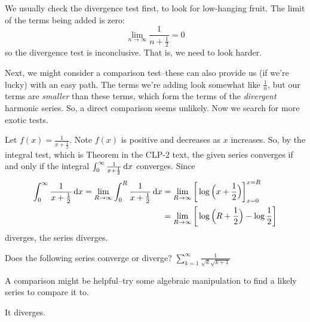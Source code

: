 \begin{solution}
We usually check the divergence test first, to look for low-hanging fruit. The limit of the terms being added is zero:
\[\lim_{n \to \infty}\frac{1}{n+\frac{1}{2}}=0\]
so the divergence test is inconclusive. That is, we need to look harder.

Next, we might consider a comparison test--these can also provide us (if we're lucky) with an easy path. The terms we're adding look somewhat like $\frac{1}{n}$, but our terms are \emph{smaller} than these terms, which form the terms of the \emph{divergent} harmonic series. So, a direct comparison seems unlikely. Now we search for more exotic tests.

Let $\displaystyle f(x) =\frac{1}{x+\frac{1}{2}}$.
Note $f(x)$ is positive and decreases as $x$ increases.
So, by the integral test, which is
Theorem  in the CLP-2 text,
the given series converges if and only if the
integral $\int_0^\infty\frac{1}{x+\frac{1}{2}} \,\mathrm{d}x$ converges.
Since
\begin{align*}
\int_0^\infty \frac{1}{x+\frac{1}{2}} \,\mathrm{d}x =
\lim_{R\rightarrow\infty} \int_0^R\frac{1}{x+\frac{1}{2}} \,\mathrm{d}x
&=\lim_{R\rightarrow\infty} \bigg[ \log\Big(x+\frac{1}{2}\Big)\bigg]^{x=R}_{x=0} \\
&=\lim_{R\to\infty} \bigg[ \log\Big(R+\frac{1}{2}\Big) - \log\frac12 \bigg]
\end{align*}
diverges, the series diverges.
\end{solution}






\begin{Mquestion}
Does the following series converge or diverge?
$\displaystyle\sum_{k=1}^\infty\frac{1}{\sqrt{k}\sqrt{k+1}}$
\end{Mquestion}

\begin{hint}
A comparison might be helpful--try some algebraic manipulation to find a likely series to compare it to.
\end{hint}

\begin{answer}
It diverges.
\end{answer}

